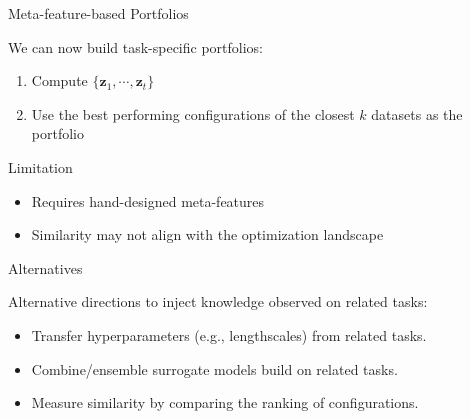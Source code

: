 \documentclass[main]{subfiles}
\begin{document}
\begin{frame}{Meta-feature-based Portfolios}

We can now build task-specific portfolios:
\begin{enumerate}
    \item Compute $\{\mathbf{z}_1, \cdots, \mathbf{z}_t\}$
    \item Use the best performing configurations of the closest $k$ datasets as the portfolio
\end{enumerate}

%
%
\begin{block}{\raggedright Limitation}
\begin{itemize}
    \item Requires hand-designed meta-features
    \item Similarity may not align with the optimization landscape
\end{itemize}
\end{block}
   
\end{frame}
\begin{frame}{Alternatives}

Alternative directions to inject knowledge observed on related tasks:
\begin{itemize}
    \item Transfer hyperparameters (e.g., lengthscales) from related tasks.
    \item Combine/ensemble surrogate models build on related tasks.
    \item Measure similarity by comparing the ranking of configurations.
\end{itemize}

\end{frame}
\end{document}
